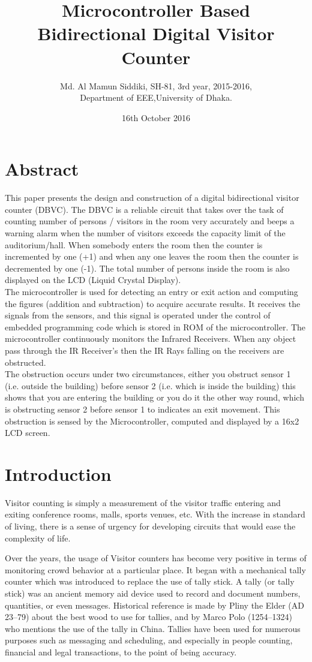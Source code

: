 \documentclass{article}
\title{\textbf{Microcontroller Based Bidirectional Digital Visitor Counter}}
\author{Md. Al Mamun Siddiki, SH-81, 3rd year, 2015-2016,\\ Department of EEE,University of Dhaka. }
\date{16th October 2016}
\begin{document}
\maketitle

\section{Abstract}
This paper presents the design and construction of a digital bidirectional visitor counter (DBVC). The DBVC is a
reliable circuit that takes over the task of counting number of persons / visitors in the room very accurately and
beeps a warning alarm when the number of visitors exceeds the capacity limit of the auditorium/hall. When
somebody enters the room then the counter is incremented by one (+1) and when any one leaves the room then
the counter is decremented by one (-1). The total number of persons inside the room is also displayed on the
LCD (Liquid Crystal Display). 
\\
The microcontroller is used for detecting an entry or exit action and computing the figures (addition and
subtraction) to acquire accurate results. It receives the signals from the sensors, and this signal is operated under
the control of embedded programming code which is stored in ROM of the microcontroller. The microcontroller
continuously monitors the Infrared Receivers. When any object pass through the IR Receiver's then the IR Rays
falling on the receivers are obstructed.
\\
The obstruction occurs under two circumstances, either you obstruct sensor 1 (i.e. outside the building) before
sensor 2 (i.e. which is inside the building) this shows that you are entering the building or you do it the other way
round, which is obstructing sensor 2 before sensor 1 to indicates an exit movement. This obstruction is sensed by
the Microcontroller, computed and displayed by a 16x2 LCD screen.

\section{Introduction}
Visitor counting is simply a measurement of the visitor traffic entering and exiting conference rooms, malls,
sports venues, etc. With the increase in standard of living, there is a sense of urgency for developing circuits that
would ease the complexity of life.

\par
Over the years, the usage of Visitor counters has become very positive in terms of monitoring crowd behavior at
a particular place. It began with a mechanical tally counter which was introduced to replace the use of tally stick.
A tally (or tally stick) was an ancient memory aid device used to record and document numbers, quantities, or
even messages. Historical reference is made by Pliny the Elder (AD 23–79) about the best wood to use for
tallies, and by Marco Polo (1254–1324) who mentions the use of the tally in China. Tallies have been used for
numerous purposes such as messaging and scheduling, and especially in people counting, financial and legal
transactions, to the point of being accuracy.\\
\par
\end{document}
